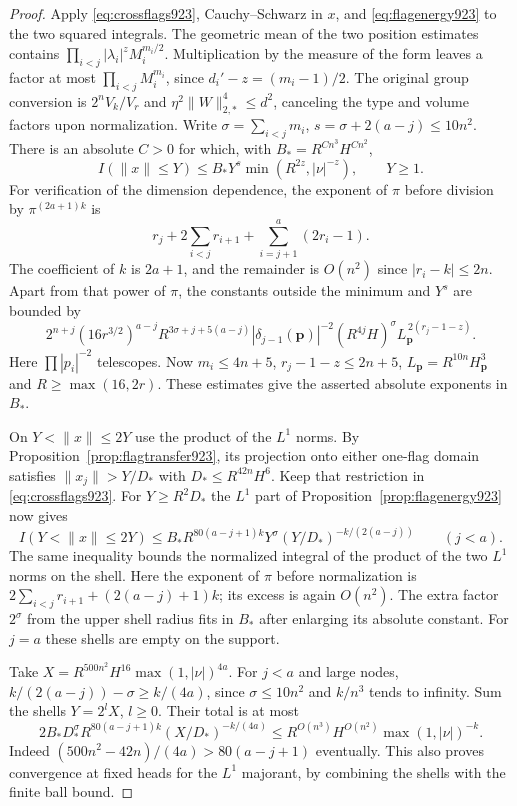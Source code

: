 \documentclass[a4paper,11pt]{article}
\theoremstyle{definition}
\theoremstyle{remark}
\numberwithin{equation}{section}
\begin{document}
\begin{proof}
Apply \eqref{eq:crossflags923}, Cauchy--Schwarz in \(x\), and
\eqref{eq:flagenergy923} to the two squared integrals.
The geometric mean of the two position estimates contains
\(\prod_{i<j}|\lambda_i|^z M_i^{m_i/2}\). Multiplication by the
measure of the form leaves a factor at most \(\prod_{i<j}M_i^{m_i}\),
since \(d_i'-z=(m_i-1)/2\).
The original group conversion is \(2^n V_k/V_r\) and
\(\eta^2\|W\|_{2,*}^4\le d^2\), canceling the type and volume
factors upon normalization. Write
\(\sigma=\sum_{i<j}m_i\), \(s=\sigma+2(a-j)\le10n^2\).
There is an absolute \(C>0\) for which, with \(B_*=R^{Cn^3}H^{Cn^2}\),
\begin{equation}
 I(\|x\|\le Y)\le B_* Y^s\min(R^{2z},|\nu|^{-z}),\qquad Y\ge1 .
 \label{eq:allwaveball924}
\end{equation}
For verification of the dimension dependence, the exponent
of \(\pi\) before division by \(\pi^{(2a+1)k}\) is
\[
       r_j+2\sum_{i<j}r_{i+1}+\sum_{i=j+1}^a(2r_i-1).
\]
The coefficient of \(k\) is \(2a+1\), and the remainder
is \(O(n^2)\) since \(|r_i-k|\le 2n\). Apart from that power
of \(\pi\), the constants outside the minimum and \(Y^s\)
are bounded by
\[
 2^{n+j}(16r^{3/2})^{a-j}
 R^{3\sigma+j+5(a-j)}
 |\delta_{j-1}(\mathbf p)|^{-2}
 (R^{4j}H)^\sigma
 L_{\mathbf p}^{\,2(r_j-1-z)}.
\]
Here \(\prod|p_i|^{-2}\) telescopes. Now \(m_i\le4n+5\),
\(r_j-1-z\le2n+5\), \(L_{\mathbf p}=R^{10n}H_{\mathbf p}^3\)
and \(R\ge\max(16,2r)\). These estimates give the asserted
absolute exponents in \(B_*\).

On \(Y<\|x\|\le2Y\) use the product of the \(L^1\) norms.
By Proposition~\ref{prop:flagtransfer923}, its projection onto
either one-flag domain satisfies \(\|x_j\|>Y/D_*\) with
\(D_*\le R^{42n}H^6\). Keep that restriction in
\eqref{eq:crossflags923}. For \(Y\ge R^2 D_*\) the \(L^1\)
part of Proposition~\ref{prop:flagenergy923} now gives
\begin{equation}
 I(Y<\|x\|\le2Y)
 \le B_* R^{80(a-j+1)k} Y^\sigma
           (Y/D_*)^{-k/(2(a-j))} \qquad(j<a).
 \label{eq:allwaveshell924}
\end{equation}
The same inequality bounds the normalized integral of the
product of the two \(L^1\) norms on the shell. Here the exponent
of \(\pi\) before normalization is
\(2\sum_{i<j}r_{i+1}+(2(a-j)+1)k\); its excess is again
\(O(n^2)\). The extra factor \(2^\sigma\) from the upper
shell radius fits in \(B_*\) after enlarging its absolute
constant. For \(j=a\) these shells are empty on the support.

Take \(X=R^{500n^2}H^{16}\max(1,|\nu|)^{4a}\).
For \(j<a\) and large nodes,
\(k/(2(a-j))-\sigma\ge k/(4a)\), since
\(\sigma\le10n^2\) and \(k/n^3\) tends to infinity.
Sum the shells \(Y=2^l X\), \(l\ge0\). Their total is at most
\[
 2B_*D_*^\sigma R^{80(a-j+1)k}(X/D_*)^{-k/(4a)}
 \le R^{O(n^3)}H^{O(n^2)}\max(1,|\nu|)^{-k}.
\]
Indeed \((500n^2-42n)/(4a)>80(a-j+1)\) eventually.
This also proves convergence at fixed heads for the \(L^1\)
majorant, by combining the shells with the finite ball bound.


\end{proof}
\end{document}
